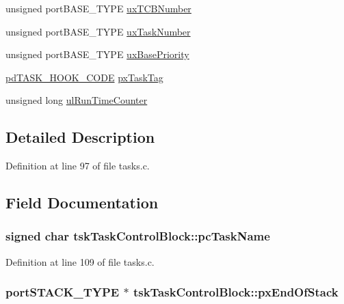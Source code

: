 \begin{DoxyCompactItemize}
unsigned port\-B\-A\-S\-E\-\_\-\-T\-Y\-P\-E \hyperlink{structtsk_task_control_block_ad1aa61c9b3fdb1483a52a0813635d964}{ux\-T\-C\-B\-Number}
\item 
unsigned port\-B\-A\-S\-E\-\_\-\-T\-Y\-P\-E \hyperlink{structtsk_task_control_block_a9ec9718baa5b502b9c8f2558bd41ea9d}{ux\-Task\-Number}
\item 
unsigned port\-B\-A\-S\-E\-\_\-\-T\-Y\-P\-E \hyperlink{structtsk_task_control_block_a50471e54a6f22994f835c0b2b358d006}{ux\-Base\-Priority}
\item 
\hyperlink{_pi_o_s_8win32_2win32_2_libraries_2_free_r_t_o_s_2_source_2include_2_free_r_t_o_s_8h_a5c18a26ca358b29dd9b235af37b572e3}{pd\-T\-A\-S\-K\-\_\-\-H\-O\-O\-K\-\_\-\-C\-O\-D\-E} \hyperlink{structtsk_task_control_block_ac020a5f4b13cbebfd6f4b21f3326ba78}{px\-Task\-Tag}
\item 
unsigned long \hyperlink{structtsk_task_control_block_a79f0077123918f7ee91496ff2b5f1ab4}{ul\-Run\-Time\-Counter}
\end{DoxyCompactItemize}


\subsection{Detailed Description}


Definition at line 97 of file tasks.\-c.



\subsection{Field Documentation}
\hypertarget{structtsk_task_control_block_ab151b08171a6a64ce7b926e2773b0ed8}{
\subsubsection[{pc\-Task\-Name}]{\setlength{\rightskip}{0pt plus 5cm}signed char tsk\-Task\-Control\-Block\-::pc\-Task\-Name}}\label{structtsk_task_control_block_ab151b08171a6a64ce7b926e2773b0ed8}


Definition at line 109 of file tasks.\-c.

\hypertarget{structtsk_task_control_block_a4005efd890c0fd0feda944ef59be146f}{
\subsubsection[{px\-End\-Of\-Stack}]{\setlength{\rightskip}{0pt plus 5cm}port\-S\-T\-A\-C\-K\-\_\-\-T\-Y\-P\-E $\ast$ tsk\-Task\-Control\-Block\-::px\-End\-Of\-Stack}}\label{structtsk_task_control_block_a4005efd890c0fd0feda944ef59be146f}


